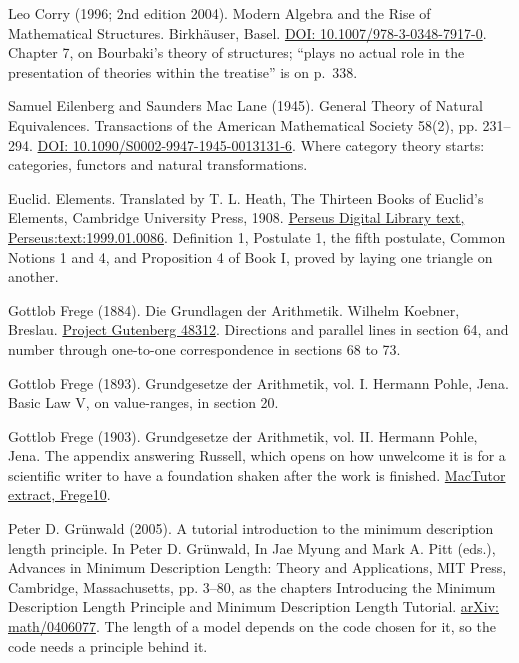 \documentclass[11pt,twoside]{article}
\theoremstyle{thielethm}
\theoremstyle{thieledef}
\theoremstyle{thieledef}
\theoremstyle{thieledef}
\theoremstyle{thielethm}
\theoremstyle{thieleobs}
\theoremstyle{thielethm}
\begin{document}
\noindent Leo Corry (1996; 2nd edition 2004). Modern Algebra and the Rise of Mathematical Structures. Birkh\"auser, Basel. \href{https://doi.org/10.1007/978-3-0348-7917-0}{DOI: 10.1007/978-3-0348-7917-0}. Chapter 7, on Bourbaki's theory of structures; ``plays no actual role in the presentation of theories within the treatise'' is on p.~338.
\par\medskip

\noindent Samuel Eilenberg and Saunders Mac Lane (1945). General Theory of Natural Equivalences. Transactions of the American Mathematical Society 58(2), pp. 231--294. \href{https://doi.org/10.1090/S0002-9947-1945-0013131-6}{DOI: 10.1090/S0002-9947-1945-0013131-6}. Where category theory starts: categories, functors and natural transformations.
\par\medskip

\noindent Euclid. Elements. Translated by T. L. Heath, The Thirteen Books of Euclid's Elements, Cambridge University Press, 1908. \href{http://www.perseus.tufts.edu/hopper/text?doc=Perseus:text:1999.01.0086}{Perseus Digital Library text, Perseus:text:1999.01.0086}. Definition 1, Postulate 1, the fifth postulate, Common Notions 1 and 4, and Proposition 4 of Book I, proved by laying one triangle on another.
\par\medskip

\noindent Gottlob Frege (1884). Die Grundlagen der Arithmetik. Wilhelm Koebner, Breslau. \href{https://www.gutenberg.org/ebooks/48312}{Project Gutenberg 48312}. Directions and parallel lines in section 64, and number through one-to-one correspondence in sections 68 to 73.
\par\medskip

\noindent Gottlob Frege (1893). Grundgesetze der Arithmetik, vol. I. Hermann Pohle, Jena. Basic Law V, on value-ranges, in section 20.
\par\medskip

\noindent Gottlob Frege (1903). Grundgesetze der Arithmetik, vol. II. Hermann Pohle, Jena. The appendix answering Russell, which opens on how unwelcome it is for a scientific writer to have a foundation shaken after the work is finished. \href{https://mathshistory.st-andrews.ac.uk/Bookpages/Frege10.html}{MacTutor extract, Frege10}.
\par\medskip

\noindent Peter D. Gr\"unwald (2005). A tutorial introduction to the minimum description length principle. In Peter D. Gr\"unwald, In Jae Myung and Mark A. Pitt (eds.), Advances in Minimum Description Length: Theory and Applications, MIT Press, Cambridge, Massachusetts, pp. 3--80, as the chapters Introducing the Minimum Description Length Principle and Minimum Description Length Tutorial. \href{https://arxiv.org/abs/math/0406077}{arXiv: math/0406077}. The length of a model depends on the code chosen for it, so the code needs a principle behind it.
\par\medskip
\end{document}
